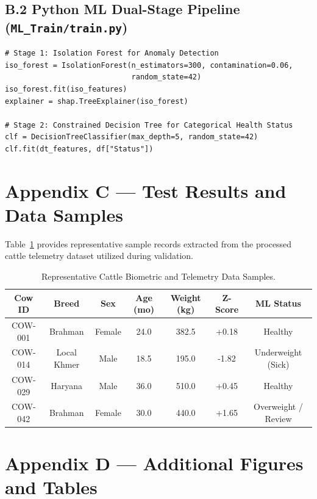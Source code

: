\documentclass[11pt,a4paper]{report}
\begin{document}
\subsection*{B.2 Python ML Dual-Stage Pipeline (\texttt{ML\_Train/train.py})}
\begin{verbatim}
# Stage 1: Isolation Forest for Anomaly Detection
iso_forest = IsolationForest(n_estimators=300, contamination=0.06, 
                             random_state=42)
iso_forest.fit(iso_features)
explainer = shap.TreeExplainer(iso_forest)

# Stage 2: Constrained Decision Tree for Categorical Health Status
clf = DecisionTreeClassifier(max_depth=5, random_state=42)
clf.fit(dt_features, df["Status"])
\end{verbatim}

\section*{Appendix C --- Test Results and Data Samples}
Table~\ref{tab:data_samples} provides representative sample records extracted from the processed cattle telemetry dataset utilized during validation.

\begin{table}[htbp]
    \centering
    \caption{Representative Cattle Biometric and Telemetry Data Samples.}
    \label{tab:data_samples}
    \vspace{0.2cm}
    \small
    \begin{tabularx}{\textwidth}{|c|c|c|c|c|c|c|}
        \hline
        \rowcolor{tableShade}
        Cow ID & Breed & Sex & Age (mo) & Weight (kg) & Z-Score & ML Status \\ \hline
        COW-001 & Brahman & Female & 24.0 & 382.5 & +0.18 & Healthy \\ \hline
        COW-014 & Local Khmer & Male & 18.5 & 195.0 & -1.82 & Underweight (Sick) \\ \hline
        COW-029 & Haryana & Male & 36.0 & 510.0 & +0.45 & Healthy \\ \hline
        COW-042 & Brahman & Female & 30.0 & 440.0 & +1.65 & Overweight / Review \\ \hline
    \end{tabularx}
\end{table}

\section*{Appendix D --- Additional Figures and Tables}
\end{document}
